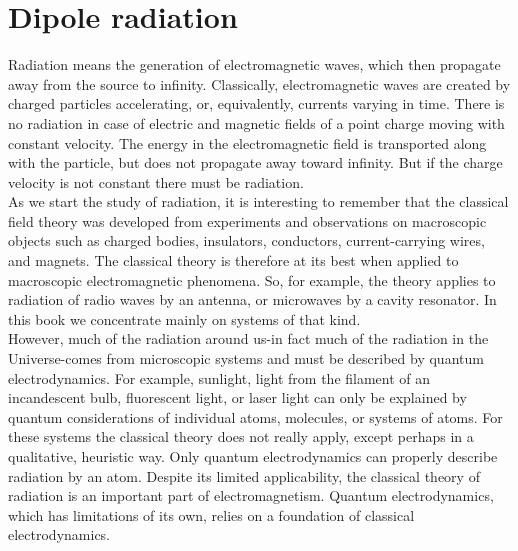 \chapter{Dipole radiation}
Radiation means the generation of electromagnetic waves, which then propagate away from the source to infinity. Classically, electromagnetic waves are created by charged particles accelerating, or, equivalently, currents varying in time. There is no radiation in case of electric and magnetic fields of a point charge moving with constant velocity. The energy in the electromagnetic field is transported along with the particle, but does not propagate away toward infinity. But if the charge velocity is not constant there must be radiation.\\
As we start the study of radiation, it is interesting to remember that the classical field theory was developed from experiments and observations on macroscopic objects such as charged bodies, insulators, conductors, current-carrying wires, and magnets. The classical theory is therefore at its best when applied to macroscopic electromagnetic phenomena. So, for example, the theory applies to radiation of radio waves by an antenna, or microwaves by a cavity resonator. In this book we concentrate mainly on systems of that kind.\\
 However, much of the radiation around us-in fact much of the radiation in the Universe-comes from microscopic systems and must be described by quantum electrodynamics. For example, sunlight, light from the filament of an incandescent bulb, fluorescent light, or laser light can only be explained by quantum considerations of individual atoms, molecules, or systems of atoms. For these systems the classical theory does not really apply, except perhaps in a qualitative, heuristic way. Only quantum electrodynamics can properly describe radiation by an atom. Despite its limited applicability, the classical theory of radiation is an important part of electromagnetism. Quantum electrodynamics, which has limitations of its own, relies on a foundation of classical electrodynamics.\\
